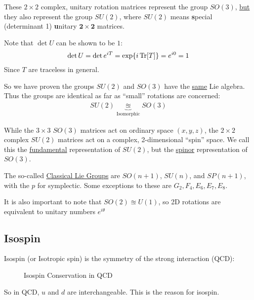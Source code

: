 These $2\times2$ complex, unitary rotation matrices represent the group $SO(3)$, \underline{but} they also represent the group $SU(2)$, where $SU(2)$ means \textbf{s}pecial (determinant 1) \textbf{u}nitary $\mathbf{2\times2}$ matrices.
\begin{aside}
  Note that $\det U$ can be shown to be $1$:
  \begin{align*}
    \det U=\det e^{iT}=\exp{i\Tr[T]}=e^{i0}=1
  \end{align*}
  Since $T$ are traceless in general.
\end{aside}

So we have proven the groups $SU(2)$ and $SO(3)$ have the \underline{same} Lie algebra. Thus the groups are identical as far as ``small'' rotations are concerned:
\begin{align*}
  SU(2)\underbrace{\approxeq}_{\text{Isomorphic}} SO(3)
\end{align*}

While the $3\times3$ $SO(3)$ matrices act on ordinary space $(x,y,z)$, the $2\times2$ complex $SU(2)$ matrices act on a complex, 2-dimensional ``spin'' space. We call this the \underline{fundamental} representation of $SU(2)$, but the \underline{spinor} representation of $SO(3)$.
\begin{remark}
  The so-called \underline{Classical Lie Groups} are $SO(n+1)$, $SU(n)$, and $SP(n+1)$, with the $p$ for symplectic. Some exceptions to these are $G_2, F_4, E_6, E_7, E_8$.

  It is also important to note that $SO(2)\approxeq U(1)$, so 2D rotations are equivalent to unitary numbers $e^{i\theta}$
\end{remark}

\subsection{Isospin}
Isospin (or Isotropic spin) is the symmetry of the strong interaction (QCD):
\begin{figure}[H]
  \centering
  \caption{Isospin Conservation in QCD}
  \label{fig:isospin}
\end{figure}
So in QCD, $u$ and $d$ are interchangeable. This is the reason for isospin.

